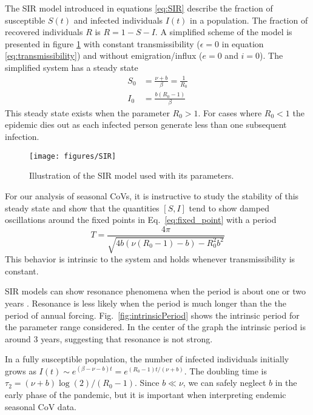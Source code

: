 \documentclass[rmp, reprint, superscriptaddress, floatfix,amsmath]{revtex4-1}
\begin{document}
The SIR model introduced in equations \ref{eq:SIR} describe the fraction of susceptible $S(t)$ and infected individuals $I(t)$ in a population. 
The fraction of recovered individuals $R$ is $R=1 - S - I$. 
A simplified scheme of the model is presented in figure \ref{fig:schemeSIR} with constant transmissibility ($\epsilon=0$ in equation \ref{eq:transmissibility}) and without emigration/influx ($e=0$ and $i=0$).
The simplified system has a steady state
\begin{equation}
\begin{split}
S_0 &= \frac{\nu + b}{\beta} = \frac{1}{R_0} \\
I_0 & = \frac{b(R_0-1)}{\beta}
\end{split}
\label{eq:fixed_point}
\end{equation}
This steady state exists when the parameter $R_0 > 1$. For cases where $R_0 < 1$ the epidemic dies out as each infected person generate less than one subsequent infection. 

\begin{figure}[htb]
	\centering
	\texttt{[image: figures/SIR]}
	\caption{Illustration of the SIR model used with its parameters.}\label{fig:schemeSIR}
\end{figure}


For our analysis of seasonal CoVs, it is instructive to study the stability of this steady state and show that the quantities $[S,I]$ tend to show damped oscillations around the fixed points in Eq.~\ref{eq:fixed_point} with a period
\begin{equation}
T = \frac{4\pi}{\sqrt{4b(\nu(R_0-1) - b) - R_0^2b^2}}
\label{eq:period}
\end{equation}
This behavior is intrinsic to the system and holds whenever transmissibility is constant.

SIR models can show resonance phenomena when the period is about one or two years \citep{dushoff_dynamical_2004,chen_regular_2017}.
Resonance is less likely when the period is much longer than the the period of annual forcing.
Fig.~\ref{fig:intrinsicPeriod} shows the intrinsic period for the parameter range considered. 
In the center of the graph the intrinsic period is around 3 years, suggesting that resonance is not strong.

In a fully susceptible population, the number of infected individuals initially grows as $I(t)\sim e^{(\beta-\nu-b)t} = e^{(R_0-1)t/(\nu+b)}$.
The doubling time is $\tau_2 = (\nu+b)\log(2)/(R_0-1)$.
Since $b\ll \nu$, we can safely neglect $b$ in the early phase of the pandemic, but it is important when interpreting endemic seasonal CoV data. 
\end{document}
